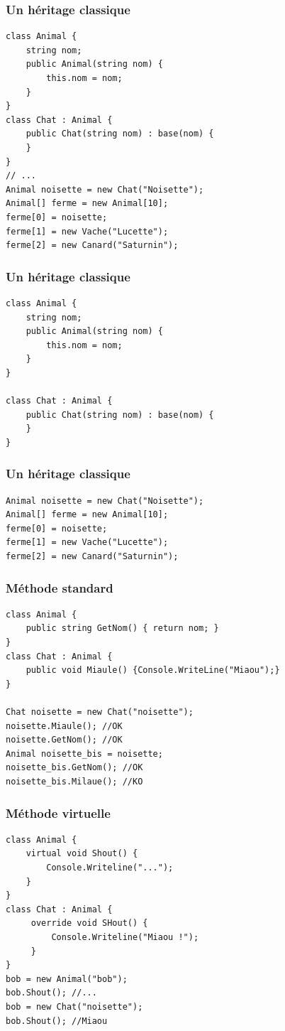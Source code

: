 \documentclass{beamer}
\begin{document}
\begin{frame}[fragile]
\frametitle{Un héritage classique}
\begin{lstlisting}
class Animal {
    string nom;
    public Animal(string nom) {
        this.nom = nom;
    }
}
class Chat : Animal {
    public Chat(string nom) : base(nom) {
    }
}
// ...
Animal noisette = new Chat("Noisette");
Animal[] ferme = new Animal[10];
ferme[0] = noisette;
ferme[1] = new Vache("Lucette");
ferme[2] = new Canard("Saturnin");
\end{lstlisting}
\end{frame}


\begin{frame}[fragile]
\frametitle{Un héritage classique}
\begin{lstlisting}
class Animal {
    string nom;
    public Animal(string nom) {
        this.nom = nom;
    }
}

class Chat : Animal {
    public Chat(string nom) : base(nom) {
    }
}
\end{lstlisting}
\end{frame}

\begin{frame}[fragile]
\frametitle{Un héritage classique}
\begin{lstlisting}
Animal noisette = new Chat("Noisette");
Animal[] ferme = new Animal[10];
ferme[0] = noisette;
ferme[1] = new Vache("Lucette");
ferme[2] = new Canard("Saturnin");
\end{lstlisting}
\end{frame}

\begin{frame}[fragile]
\frametitle{Méthode standard}
\begin{lstlisting}
class Animal {
    public string GetNom() { return nom; }
}
class Chat : Animal {
    public void Miaule() {Console.WriteLine("Miaou");}
}

Chat noisette = new Chat("noisette");
noisette.Miaule(); //OK
noisette.GetNom(); //OK
Animal noisette_bis = noisette;
noisette_bis.GetNom(); //OK
noisette_bis.Milaue(); //KO
\end{lstlisting}
\end{frame}


\begin{frame}[fragile]
\frametitle{Méthode virtuelle}
\begin{lstlisting}
class Animal {
    virtual void Shout() {
        Console.Writeline("...");
    }
}
class Chat : Animal {
     override void SHout() {
         Console.Writeline("Miaou !");
     }
}
bob = new Animal("bob");
bob.Shout(); //...
bob = new Chat("noisette");
bob.Shout(); //Miaou
\end{lstlisting}
\end{frame}
\end{document}
